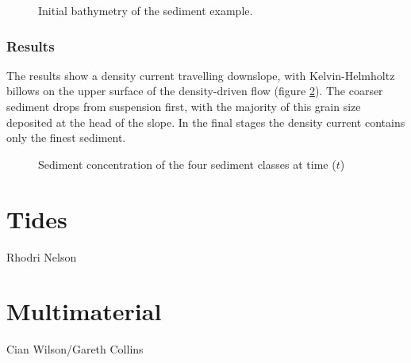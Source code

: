 \begin{figure}[ht]
  \centering
  \caption{Initial bathymetry of the sediment example.}
  \label{Fig:sediment:bathymetry}
\end{figure}

\subsubsection{Results}

The results show a density current travelling downslope, with Kelvin-Helmholtz billows
on the upper surface of the density-driven flow (figure \ref{fig:sediment_concentration}). 
The coarser sediment drops from suspension first, with the majority of this
grain size deposited at the head of the slope. In the final stages the density current contains
only the finest sediment.
\begin{figure}[ht]
  \centering
  \caption{Sediment concentration of the four sediment classes at time ($t$)}
  \label{fig:sediment_concentration}
\end{figure}





\section{Tides}
\label{sect:tides}

Rhodri Nelson


\section{Multimaterial}
\label{sect:multimaterial}

Cian Wilson/Gareth Collins



